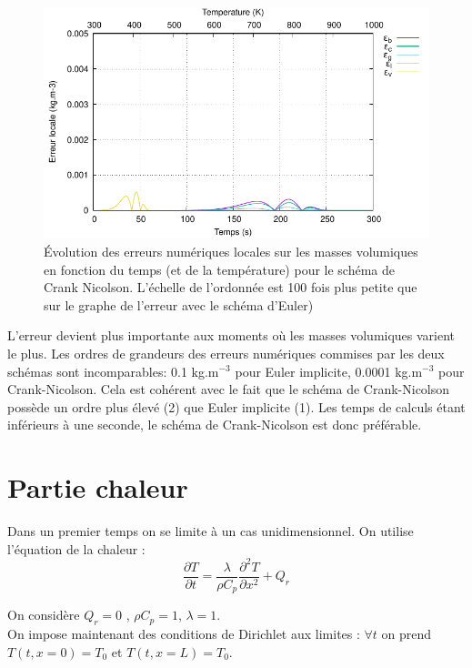\documentclass[a4paper,11pt]{article}
\begin{document}
\begin{figure}[H]
    \centering
    \includegraphics[width=0.75\linewidth]{images/error_CK2.pdf}
    \caption{\centering \footnotesize Évolution des erreurs numériques locales sur les masses volumiques en fonction du temps (et de la température) pour le schéma de Crank Nicolson. L'échelle de l'ordonnée est 100 fois plus petite que sur le graphe de l'erreur avec le schéma d'Euler)}
    \label{fig:erCK2}
\end{figure}

L'erreur devient plus importante aux moments où les masses volumiques varient le plus. Les ordres de grandeurs des erreurs numériques commises par les deux schémas sont incomparables: 0.1 kg.m$^{-3}$ pour Euler implicite, 0.0001 kg.m$^{-3}$ pour Crank-Nicolson. Cela est cohérent avec le fait que le schéma de Crank-Nicolson possède un ordre plus élevé (2) que Euler implicite (1). Les temps de calculs étant inférieurs à une seconde, le schéma de Crank-Nicolson est donc préférable.

\section{Partie chaleur}
Dans un premier temps on se limite à un cas unidimensionnel.
On utilise l'équation de la chaleur : 
\begin{equation}\label{eq:6}
\frac{\partial T}{\partial t} =    \frac{\lambda}{ \rho C_p} \frac{\partial^2 T}{\partial x^2} + Q_r
\end{equation}

On considère $ Q_r = 0$ , $\rho C_p = 1 $, $\lambda = 1$.  \\

On impose maintenant des conditions de Dirichlet aux limites : $\forall t$ on prend $ T(t, x=0) = T_0$ et $T(t, x=L) = T_0$. \\

\end{document}

